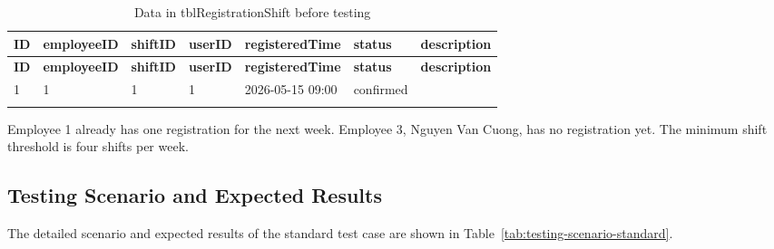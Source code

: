 \begin{longtable}{|p{}|p{}|p{}|p{}|p{}|p{}|p{}|}
\hline
\textbf{ID} & \textbf{employeeID} & \textbf{shiftID} & \textbf{userID} & \textbf{registeredTime} & \textbf{status} & \textbf{description} \\
\hline
\endfirsthead
\hline
\textbf{ID} & \textbf{employeeID} & \textbf{shiftID} & \textbf{userID} & \textbf{registeredTime} & \textbf{status} & \textbf{description} \\
\hline
\endhead
1 & 1 & 1 & 1 & 2026-05-15 09:00 & confirmed & \\
\hline
\caption{Data in tblRegistrationShift before testing}\label{tab:testing-registration-before}
\end{longtable}

Employee 1 already has one registration for the next week. Employee 3, Nguyen Van Cuong, has no registration yet. The minimum shift threshold is four shifts per week.

\subsection{Testing Scenario and Expected Results}

The detailed scenario and expected results of the standard test case are shown in Table~\ref{tab:testing-scenario-standard}.

